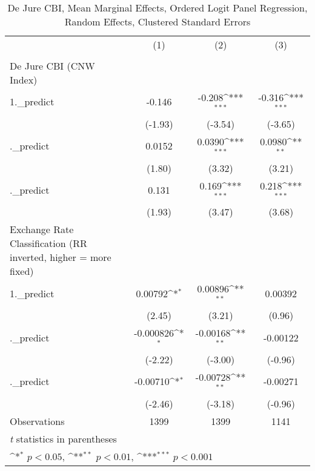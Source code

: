 \begin{table}[htbp]\centering
\def\sym#1{\ifmmode^{#1}\else\(^{#1}\)\fi}
\caption{De Jure CBI, Mean Marginal Effects, Ordered Logit Panel Regression, Random Effects, Clustered Standard Errors \label{ordLogDJ}}
\begin{tabular}{l*{3}{c}}
\toprule
                                        &\multicolumn{1}{c}{(1)}&\multicolumn{1}{c}{(2)}&\multicolumn{1}{c}{(3)}\\
                                        &\multicolumn{1}{c}{}&\multicolumn{1}{c}{}&\multicolumn{1}{c}{}\\
\midrule
De Jure CBI (CNW Index)                 &                  &                  &                  \\
1.\_predict                              &   -0.146         &   -0.208\sym{***}&   -0.316\sym{***}\\
                                        &  (-1.93)         &  (-3.54)         &  (-3.65)         \\
\addlinespace
2.\_predict                              &   0.0152         &   0.0390\sym{***}&   0.0980\sym{**} \\
                                        &   (1.80)         &   (3.32)         &   (3.21)         \\
\addlinespace
3.\_predict                              &    0.131         &    0.169\sym{***}&    0.218\sym{***}\\
                                        &   (1.93)         &   (3.47)         &   (3.68)         \\
\midrule
Exchange Rate Classification (RR inverted, higher = more fixed)&                  &                  &                  \\
1.\_predict                              &  0.00792\sym{*}  &  0.00896\sym{**} &  0.00392         \\
                                        &   (2.45)         &   (3.21)         &   (0.96)         \\
\addlinespace
2.\_predict                              &-0.000826\sym{*}  & -0.00168\sym{**} & -0.00122         \\
                                        &  (-2.22)         &  (-3.00)         &  (-0.96)         \\
\addlinespace
3.\_predict                              & -0.00710\sym{*}  & -0.00728\sym{**} & -0.00271         \\
                                        &  (-2.46)         &  (-3.18)         &  (-0.96)         \\
\midrule
Observations                            &     1399         &     1399         &     1141         \\
\bottomrule
\multicolumn{4}{l}{\footnotesize \textit{t} statistics in parentheses}\\
\multicolumn{4}{l}{\footnotesize \sym{*} \(p<0.05\), \sym{**} \(p<0.01\), \sym{***} \(p<0.001\)}\\
\end{tabular}
\end{table}
